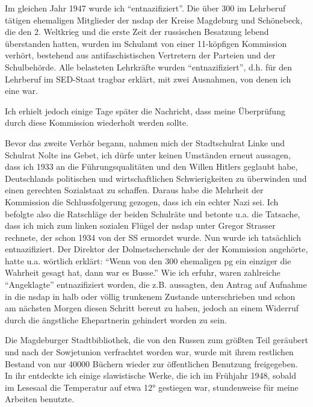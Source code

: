 Im gleichen Jahr 1947 wurde ich \enquote{entnazifiziert}. Die über 300 im Lehrberuf tätigen  ehemaligen Mitglieder der \ac{nsdap} der Kreise Magdeburg und Schönebeck, die den 2. Weltkrieg und die erste Zeit der russischen Besatzung lebend überstanden hatten, wurden im Schulamt von einer 11-köpfigen Kommission verhört, bestehend aus antifaschistischen Vertretern der Parteien und der Schulbehörde. Alle belasteten Lehrkräfte wurden \enquote{entnazifiziert}, d.h. für den Lehrberuf im SED-Staat tragbar erklärt, mit zwei Ausnahmen, von denen ich eine war.

Ich erhielt jedoch einige Tage später die Nachricht, dass meine Überprüfung durch diese Kommission wiederholt werden sollte.

Bevor das zweite Verhör begann, nahmen mich der Stadtschulrat Linke und Schulrat Nolte ins Gebet, ich dürfe unter keinen Umständen erneut aussagen, dass ich 1933 an die Führungsqualitäten und den Willen Hitlers geglaubt habe, Deutschlands politischen und wirtschaftlichen Schwierigkeiten zu überwinden und einen gerechten Sozialstaat zu schaffen. Daraus habe die Mehrheit der Kommission die Schlussfolgerung gezogen, dass ich ein echter Nazi sei. Ich befolgte also die Ratschläge der beiden Schulräte und betonte u.a. die Tatsache, dass ich mich zum linken sozialen Flügel der \ac{nsdap} unter Gregor Strasser rechnete, der schon 1934 von der SS ermordet wurde. Nun wurde ich tatsächlich entnazifiziert. Der Direktor der Dolmetscherschule der der Kommission angehörte, hatte u.a. wörtlich erklärt: \enquote{Wenn von den 300 ehemaligen \ac{pg} ein einziger die Wahrheit gesagt hat, dann war es Busse.} Wie ich erfuhr, waren zahlreiche \enquote{Angeklagte} entnazifiziert worden, die z.B. aussagten, den Antrag auf Aufnahme in die \ac{nsdap} in halb oder völlig trunkenem Zustande unterschrieben und schon am nächsten Morgen diesen Schritt bereut zu haben, jedoch an einem Widerruf durch die ängstliche Ehepartnerin gehindert worden zu sein.

Die Magdeburger Stadtbibliothek, die von den Russen zum größten Teil geräubert und nach der Sowjetunion verfrachtet worden war, wurde mit ihrem restlichen Bestand von nur \num{40000} Büchern wieder zur öffentlichen Benutzung freigegeben. In ihr entdeckte ich einige slawistische Werke, die ich im Frühjahr 1948, sobald im Lesesaal die Temperatur auf etwa 12° gestiegen war, stundenweise für meine Arbeiten benutzte.

